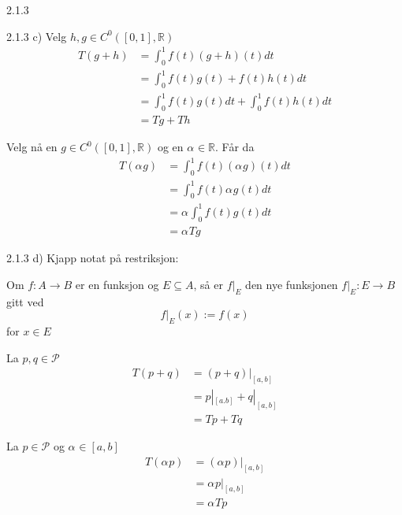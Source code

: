 \documentclass[a4paper,norsk]{article}
\begin{document}
\begin{oppgavebox}{2.1.3}{}
\begin{proofbox}{2.1.3 c)}{}
Velg $ h, g \in C^0 \left( \left[ 0, 1 \right] , \mathbb{R} \right)  $ 
\begin{align*}
    T \left( g + h \right) &= \int_{0}^{1} f(t) \left( g + h \right) (t) dt \\
    &= \int_{0}^{1} f(t)g(t) + f(t) h(t) dt  \\
    &= \int_{0}^{1} f(t)g(t) dt + \int_{0}^{1} f(t) h(t) dt \\
    &= Tg + Th   
\end{align*}

Velg nå en $ g \in C^0 \left( \left[ 0, 1 \right] , \mathbb{R} \right) $ og en $ \alpha_{}^{} \in \mathbb{R} $. Får da
\begin{align*}
    T \left( \alpha_{}^{} g \right) &= \int_{0}^{1} f(t) \left( \alpha_{}^{} g \right) \left( t \right) dt \\
    &= \int_{0}^{1} f(t) \alpha_{}^{} g(t) dt \\
    &= \alpha_{}^{} \int_{0}^{1}  f(t) g(t) dt\\
    &= \alpha_{}^{} Tg
\end{align*}
\end{proofbox}

\begin{proofbox}{2.1.3 d)}{}
Kjapp notat på restriksjon:

Om $ f: A \rightarrow B $ er en funksjon og $ E \subseteq A $, så er $ f|_E $ den nye funksjonen $ f|_E : E \rightarrow B $ gitt ved 
\[
    f|_E (x) := f(x) 
\]
for $ x \in E $ 

La $ p, q \in \mathcal{P} $ 
\begin{align*}
  T \left( p + q \right) &= \left( p+q \right) |_{ \left[ a, b \right] }\\
  &= p|_{ \left[ a. b \right] } + q|_{ \left[ a, b \right] }\\
  &= Tp + Tq
\end{align*}

La $ p \in  \mathcal{P} $ og $ \alpha_{}^{} \in  \left[ a, b \right]  $ 
\begin{align*}
  T \left( \alpha_{}^{} p \right)  &= \left( \alpha_{}^{} p \right) |_{ \left[ a, b \right] } \\
  &= \alpha_{}^{} p|_{ \left[ a, b \right] } \\
  &=\alpha_{}^{} T p
\end{align*}
\end{proofbox}
\end{oppgavebox}
\end{document}
